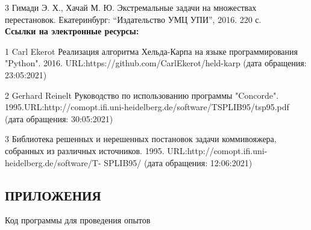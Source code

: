 \documentclass[a4paper, 14pt]{extarticle}
\numberwithin{equation}{section}
\begin{document}
3 Гимади Э. Х., Хачай М. Ю. Экстремальные задачи на множествах перестановок. Екатеринбург: “Издательство УМЦ УПИ”, 2016. 220 с.\\

\textbf{Ссылки на электронные ресурсы:}

1 Carl Ekerot Реализация алгоритма Хельда-Карпа на языке программирования "Python". 2016. URL:https://github.com/CarlEkerot/held-karp (дата обращения: 23:05:2021)

2 Gerhard Reinelt Руководство по использованию программы "Concorde". 1995.URL:http://comopt.ifi.uni-heidelberg.de/software/TSPLIB95/tsp95.pdf (дата обращения: 30:05:2021)

3 Библиотека решенных и нерешенных постановок задачи коммивояжера, собранных из различных источников. 1995. URL:http://comopt.ifi.uni-heidelberg.de/software/T-
SPLIB95/ (дата обращения: 12:06:2021)

\newpage

\begin{center}
\chapter{\textbf{ПРИЛОЖЕНИЯ}}
\end{center}

Код программы для проведения опытов
\end{document}
